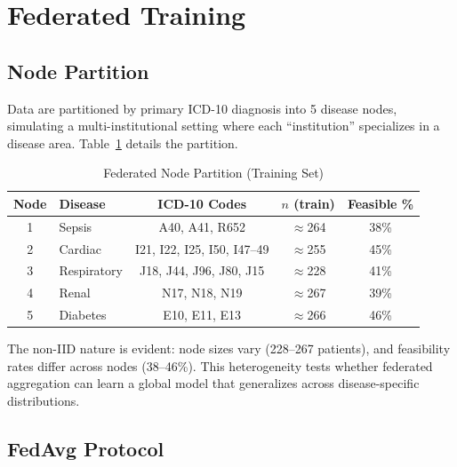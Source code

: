 \section{Federated Training}

\subsection{Node Partition}

Data are partitioned by primary ICD-10 diagnosis into 5 disease nodes, simulating a multi-institutional setting where each ``institution'' specializes in a disease area. Table~\ref{tab:node_partition} details the partition.

\begin{table}[htbp]
\centering
\caption{Federated Node Partition (Training Set)}
\small
\begin{tabular}{clccc}
\toprule
\textbf{Node} & \textbf{Disease} & \textbf{ICD-10 Codes} & \textbf{$n$ (train)} & \textbf{Feasible \%} \\
\midrule
1 & Sepsis & A40, A41, R652 & $\approx$264 & 38\% \\
2 & Cardiac & I21, I22, I25, I50, I47--49 & $\approx$255 & 45\% \\
3 & Respiratory & J18, J44, J96, J80, J15 & $\approx$228 & 41\% \\
4 & Renal & N17, N18, N19 & $\approx$267 & 39\% \\
5 & Diabetes & E10, E11, E13 & $\approx$266 & 46\% \\
\bottomrule
\end{tabular}
\label{tab:node_partition}
\end{table}

The non-IID nature is evident: node sizes vary (228--267 patients), and feasibility rates differ across nodes (38--46\%). This heterogeneity tests whether federated aggregation can learn a global model that generalizes across disease-specific distributions.

\subsection{FedAvg Protocol}

